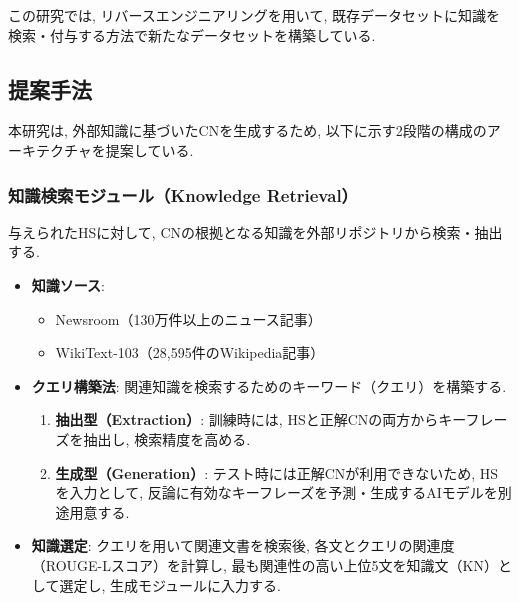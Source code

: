 \documentclass[dvipdfmx]{jsarticle}
\begin{document}
この研究では, リバースエンジニアリングを用いて, 既存データセットに知識を検索・付与する方法で新たなデータセットを構築している.

\vspace{0.5em}

\subsection{提案手法}

本研究は, 外部知識に基づいたCNを生成するため, 以下に示す2段階の構成のアーキテクチャを提案している.

\subsubsection{知識検索モジュール（Knowledge Retrieval）}

与えられたHSに対して, CNの根拠となる知識を外部リポジトリから検索・抽出する.

\begin{itemize}
  \item \textbf{知識ソース}:
        \begin{itemize}
          \item Newsroom（130万件以上のニュース記事）
          \item WikiText-103（28,595件のWikipedia記事）
        \end{itemize}
        \vspace{0.5em}

  \item \textbf{クエリ構築法}: 関連知識を検索するためのキーワード（クエリ）を構築する.
        \begin{enumerate}
          \item \textbf{抽出型（Extraction）}: 訓練時には, HSと正解CNの両方からキーフレーズを抽出し, 検索精度を高める.
          \item \textbf{生成型（Generation）}: テスト時には正解CNが利用できないため, HSを入力として, 反論に有効なキーフレーズを予測・生成するAIモデルを別途用意する.
        \end{enumerate}
        \vspace{0.5em}

  \item \textbf{知識選定}:
        クエリを用いて関連文書を検索後, 各文とクエリの関連度（ROUGE-Lスコア）を計算し, 最も関連性の高い上位5文を知識文（KN）として選定し, 生成モジュールに入力する.
\end{itemize}

\vspace{0.5em}
\end{document}

